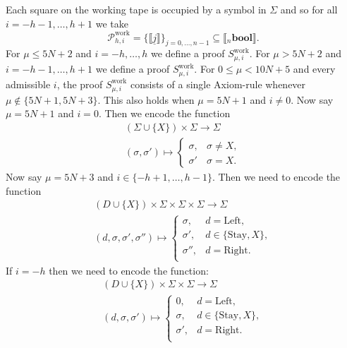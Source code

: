 \documentclass[english,letter paper,12pt,reqno]{article}
\theoremstyle{definition}
\newcommand{\lto}{\longrightarrow}
\begin{document}
Each square on the working tape is occupied by a symbol in $\Sigma$ and so for all $i = -h-1, \ldots, h+1$ we take
\begin{equation}
    \mathcal{P}^{\text{work}}_{h,i} = \{\llbracket \underline{j}\rrbracket\}_{j = 0, \ldots, n-1} \subseteq \llbracket {}_n\textbf{bool}\rrbracket.
\end{equation}
For $\mu \leq 5N+2$ and $i = -h, \ldots, h$ we define a proof $S^{\text{work}}_{\mu,i}$. For $\mu > 5N+2$ and $i = -h-1, \ldots, h+1$ we define a proof $S^{\text{work}}_{\mu,i}$. For $0 \leq \mu < 10N+5$ and every admissible $i$, the proof $S^{\text{work}}_{\mu,i}$ consists of a single Axiom-rule whenever $\mu \notin \{5N+1,5N+3\}$. This also holds when $\mu = 5N+1$ and $i \neq 0$. Now say $\mu = 5N+1$ and $i = 0$. Then we encode the function
\begin{align*}
    (\Sigma \cup \{X\}) \times \Sigma \lto \Sigma\\
    (\sigma,\sigma') \longmapsto
    \begin{cases}
        \sigma, & \sigma \neq X,\\
        \sigma' & \sigma = X.
    \end{cases}
\end{align*}
Now say $\mu = 5N+3$ and $i \in \{-h+1, \ldots, h-1\}$. Then we need to encode the function
\begin{gather*}
    (D \cup \{X\}) \times \Sigma \times \Sigma \times \Sigma \lto \Sigma\\
    (d, \sigma, \sigma', \sigma'') \longmapsto
    \begin{cases}
        \sigma, & d = \text{Left},\\
        \sigma', & d \in \{\text{Stay},X\},\\
        \sigma'', & d = \text{Right}.\\
    \end{cases}
\end{gather*}
If $i = -h$ then we need to encode the function:
\begin{gather*}
    (D \cup \{X\}) \times \Sigma \times \Sigma \lto \Sigma\\
    (d, \sigma, \sigma') \longmapsto
    \begin{cases}
        0, & d = \text{Left},\\
        \sigma, & d \in \{\text{Stay},X\},\\
        \sigma', & d = \text{Right}.\\
    \end{cases}
\end{gather*}
\end{document}
